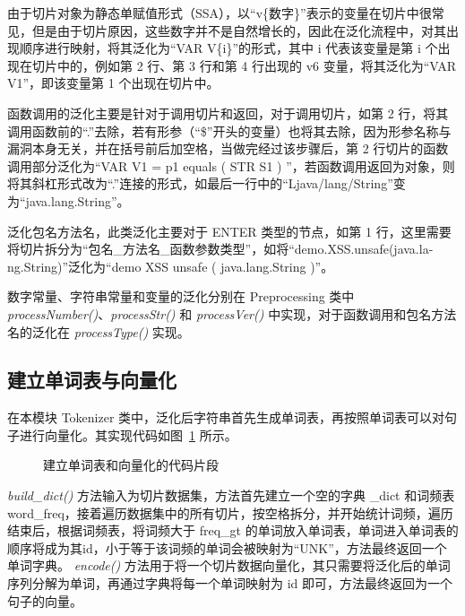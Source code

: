 由于切片对象为静态单赋值形式（SSA），以“v\{数字\}”表示的变量在切片中很常见，但是由于切片原因，这些数字并不是自然增长的，因此在泛化流程中，对其出现顺序进行映射，将其泛化为“VAR V\{i\}”的形式，其中 i 代表该变量是第 i 个出现在切片中的，例如第 2 行、第 3 行和第 4 行出现的 v6 变量，将其泛化为“VAR V1”，即该变量第 1 个出现在切片中。

函数调用的泛化主要是针对于调用切片和返回，对于调用切片，如第 2 行，将其调用函数前的“.”去除，若有形参（“\$”开头的变量）也将其去除，因为形参名称与漏洞本身无关，并在括号前后加空格，当做完经过该步骤后，第 2 行切片的函数调用部分泛化为“VAR V1 = p1 equals ( STR S1 ) ”，若函数调用返回为对象，则将其斜杠形式改为“.”连接的形式，如最后一行中的“Ljava/lang/String”变为“java.lang.String”。

泛化包名方法名，此类泛化主要对于 ENTER 类型的节点，如第 1 行，这里需要将切片拆分为“包名\_方法名\_函数参数类型”，如将“demo.XSS.unsafe(java.la-\\ng.String)”泛化为“demo XSS unsafe ( java.lang.String )”。

数字常量、字符串常量和变量的泛化分别在 Preprocessing 类中 \textit{processNumber()}、\textit{processStr()} 和 \textit{processVer()} 中实现，对于函数调用和包名方法名的泛化在 \textit{processType()} 实现。

\subsection{建立单词表与向量化}

在本模块 Tokenizer 类中，泛化后字符串首先生成单词表，再按照单词表可以对句子进行向量化。其实现代码如图~\ref{code:preTokenize} 所示。

\begin{figure}[htbp]
    \centering
    \begin{minipage}{0.9\textwidth}
        
    \end{minipage}
    \caption{建立单词表和向量化的代码片段}\label{code:preTokenize}
\end{figure}

\textit{build\_dict()} 方法输入为切片数据集，方法首先建立一个空的字典 \_dict 和词频表 word\_freq，接着遍历数据集中的所有切片，按空格拆分，并开始统计词频，遍历结束后，根据词频表，将词频大于 freq\_gt 的单词放入单词表，单词进入单词表的顺序将成为其id，小于等于该词频的单词会被映射为“UNK”，方法最终返回一个单词字典。
\textit{encode()} 方法用于将一个切片数据向量化，其只需要将泛化后的单词序列分解为单词，再通过字典将每一个单词映射为 id 即可，方法最终返回为一个句子的向量。

